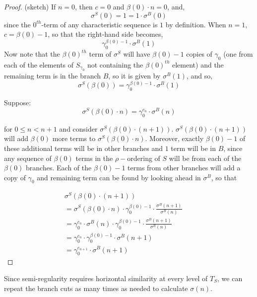 
\begin{proof}
(sketch)
If $n=0$, then $c=0$ and $\beta(0) \cdot n = 0$, and,
\[\sigma^S(0)= 1 =	1 \cdot \sigma^{B}(0)\]
since the $0^{th}$-term of any characteristic sequence is $1$ by definition. When $n=1$, $c=\beta(0)-1$, so that the right-hand side becomes,
\[\gamma_0^{\beta(0)-1} \cdot \sigma^{B}(1)\]
Now note that the $\beta(0)^{th}$ term of $\sigma^S$ will have $\beta(0)-1$ copies of $\gamma_0$ (one from each of the elements of $S_{\gamma_0}$ not containing the $\beta(0)^{th}$ element) and the remaining term is in the branch $B$, so it is given by $\sigma^B(1)$, and so,
\[\sigma^S(\beta(0))=\gamma_0^{\beta(0)-1} \cdot \sigma^{B}(1)\]


Suppose:
\[\sigma^S(\beta(0) \cdot n)=\gamma_0^{c_n} \cdot \sigma^{B}(n)\]

for $0 \leq n < n +1$ and consider $\sigma^S(\beta(0) \cdot (n+1))$. $\sigma^S(\beta(0) \cdot (n+1))$ will add $\beta(0)$ more terms to $\sigma^S(\beta(0) \cdot n)$. Moreover, exactly $\beta(0)-1$ of these additional terms will be in other branches and $1$ term will be in $B$, since any sequence of $\beta(0)$ terms in the $\rho-$ordering of $S$ will be from each of the $\beta(0)$ branches. Each of the $\beta(0)-1$ terms from other branches will add a copy of $\gamma_0$ and remaining term can be found by looking ahead in $\sigma^B$, so that

\begin{align*}
\sigma^S(\beta(0) \cdot (n+1)) && \\
= \sigma^S(\beta(0) \cdot n) \cdot \gamma_0^{\beta(0)-1} \cdot \frac{\sigma^B(n+1)}{\sigma^B(n)} && \\
= {\gamma_0^{c_n}} \cdot \sigma^{B}(n) \cdot \gamma_0^{\beta(0)-1} \cdot  \frac{\sigma^B(n+1)}{\sigma^B(n)} &&\\
= {\gamma_0^{c_n}}  \cdot \gamma_0^{\beta(0)-1} \cdot  \sigma^B(n+1) && \\
= {\gamma_0^{c_{n+1}}} \cdot  \sigma^B(n+1) 
\end{align*}

\end{proof}
Since semi-regularity requires horizontal similarity at every level of $T_S$, we can repeat the branch cuts as many times as needed to calculate $\sigma(n)$.

